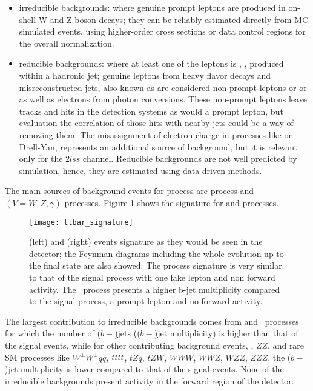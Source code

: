 \begin{itemize}

\item irreducible backgrounds: where genuine prompt leptons are produced in on-shell W and Z boson decays; they can be reliably estimated directly from MC simulated events, using higher-order cross sections or data control regions for the overall normalization.

\item reducible backgrounds: where at least one of the leptons is , \ie, produced within a hadronic jet; genuine leptons from heavy flavor decays and misreconstructed jets, also known as  are considered non-prompt leptons or or  as well as electrons from photon conversions. These non-prompt leptons leave tracks and hits in the detection systems as would a prompt lepton, but evaluation the correlation of those hits with nearby jets could be a way of removing them. The misassignment of electron charge in processes like \ttbar or Drell-Yan, represents an additional source of background, but it is relevant only for the $2lss$ channel. Reducible backgrounds are not well predicted by simulation, hence, they are estimated using data-driven methods. 
\end{itemize}

The main sources of background events for \tHq process are \ttbar process and \ttV $(V=W,Z,\gamma)$ processes. Figure \ref{fig:ttbar_sign} shows the signature for \ttbar and \ttW processes.     

\begin{figure}[!htb]
\centering
\texttt{[image: ttbar\_signature]}
\caption[\ttbar and \ttW events signature]{\ttbar(left) and \ttW (right) events signature as they would be seen in the detector; the Feynman diagrams including the whole evolution up to the final state are also showed. The \ttbar process signature is very similar to that of the signal process with one fake lepton and non forward activity. The \ttW\ process presents a higher b-jet multiplicity compared to the signal process, a prompt lepton and no forward activity.}
\label{fig:ttbar_sign}
\end{figure}

The largest contribution to irreducible backgrounds comes from \ttW and \ttZ\ processes for which the number of ($b-$)jets (($b-$)jet multiplicity) is higher than that of the signal events, while for other contributing background events,  \WZ, $ZZ$, and rare SM processes like $W^\pm W^\pm qq$, $t\bar{t}t\bar{t}$, $tZq$, $tZW$, $WWW$, $WWZ$, $WZZ$, $ZZZ$, the ($b-$)jet multiplicity is lower compared to that of the signal events. None of the irreducible backgrounds present activity in the forward region of the detector.

